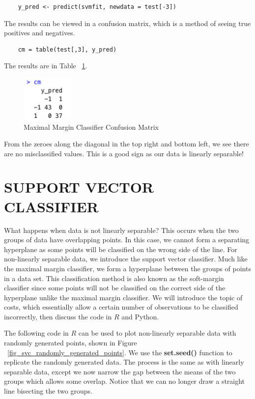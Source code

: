 \documentclass[12pt]{article}
\begin{document}
\begin{verbatim}
    y_pred <- predict(svmfit, newdata = test[-3])
\end{verbatim}

The results can be viewed in a confusion matrix, which is a method of seeing true positives and negatives.

\begin{verbatim}
    cm = table(test[,3], y_pred)
\end{verbatim}

The results are in Table ~\ref*{fig_mmc_cm}.

\begin{figure}[H]
    \centering
    \includegraphics[width=1in]{Figures/mmc/mmc_cm.png}
    \caption{Maximal Margin Classifier Confusion Matrix}
    \label{fig_mmc_cm}
\end{figure}

From the zeroes along the diagonal in the top right and bottom left, we see there are no misclassified values. This is a good sign as our data is linearly separable!

\section{SUPPORT VECTOR CLASSIFIER}

What happens when data is not linearly separable? This occurs when the two groups of data have overlapping points. In this case, we cannot form a separating hyperplane as some points will be classified on the wrong side of the line. For non-linearly separable data, we introduce the support vector classifier. Much like the maximal margin classifier, we form a hyperplane between the groups of points in a data set. This classification method is also known as the soft-margin classifier since some points will not be classified on the correct side of the hyperplane unlike the maximal margin classifier. We will introduce the topic of costs, which essentially allow a certain number of observations to be classified incorrectly, then discuss the code in $R$ and Python.

The following code in $R$ can be used to plot non-linearly separable data with randomly generated points, shown in Figure ~\ref{fig_svc_randomly_generated_points}. We use the \textbf{set.seed()} function to replicate the randomly generated data. The process is the same as with linearly separable data, except we now narrow the gap between the means of the two groups which allows some overlap. Notice that we can no longer draw a straight line bisecting the two groups.
\end{document}
